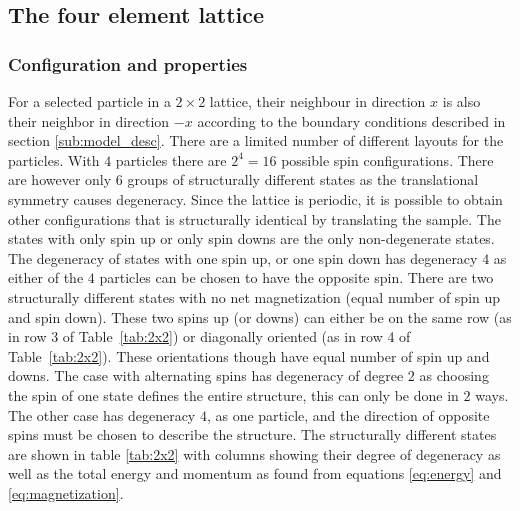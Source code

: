 \documentclass[english,notitlepage,reprint,nofootinbib]{revtex4-1}  %
\begin{document}
\subsection{The four element lattice}
\subsubsection*{Configuration and properties}\label{sub:config}
For a selected particle in a $2\times 2$ lattice, their neighbour in direction $x$ is also their neighbor in direction $-x$ according to the boundary conditions described in section \ref{sub:model_desc}. 
There are a limited number of different layouts for the particles. With $4$ particles there are $2^4 = 16$ possible spin configurations. There are however only $6$ groups of structurally different states as the translational symmetry causes degeneracy. Since the lattice is periodic, it is possible to obtain other configurations that is structurally identical by translating the sample.
The states with only spin up or only spin downs are the only non-degenerate states. The degeneracy of states with one spin up, or one spin down has degeneracy $4$ as either of the $4$ particles can be chosen to have the opposite spin.
There are two structurally different states with no net magnetization (equal number of spin up and spin down). These two spins up (or downs) can either be on the same row (as in row 3 of Table~\ref{tab:2x2}) or diagonally oriented (as in row 4 of Table~\ref{tab:2x2}). These orientations though have equal number of spin up and downs. 
The case with alternating spins has degeneracy of degree $2$ as choosing the spin of one state defines the entire structure, this can only be done in $2$ ways. The other case has degeneracy $4$, as one particle, and the direction of opposite spins must be chosen to describe the structure.
The structurally different states are shown in table \ref{tab:2x2} with columns showing their degree of degeneracy as well as the total energy and momentum as found from equations \eqref{eq:energy} and \eqref{eq:magnetization}.
\end{document}
